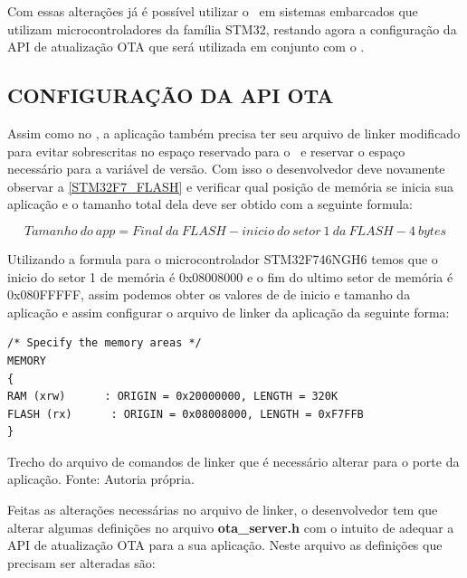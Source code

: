 Com essas alterações já é possível utilizar o \bootloader\ em sistemas embarcados que utilizam microcontroladores da família STM32, restando agora a configuração da API de atualização OTA que será utilizada em conjunto com o \bootloader.

\subsection{CONFIGURAÇÃO DA API OTA}
Assim como no \bootloader, a aplicação também precisa ter seu arquivo de linker modificado para evitar sobrescritas no espaço reservado para o \bootloader\ e reservar o espaço necessário para a variável de versão. Com isso o desenvolvedor deve novamente observar a \autoref{STM32F7_FLASH} e verificar qual posição de memória se inicia sua aplicação e o tamanho total dela deve ser obtido com a seguinte formula:

\begin{equation}
    Tamanho\ do\ app = Final\ da\ FLASH - inicio\ do\ setor\ 1\ da\ FLASH - 4\ bytes 
    \label{eq:calculo_flash}
\end{equation}


Utilizando a formula para o microcontrolador STM32F746NGH6 temos que o inicio do setor 1 de memória é 0x08008000 e o fim do ultimo setor de memória é 0x080FFFFF, assim podemos obter os valores de de inicio e tamanho da aplicação e assim configurar o arquivo de linker da aplicação da seguinte forma:


\begin{algorithm}[H]
\begin{lstlisting}
/* Specify the memory areas */
MEMORY
{
RAM (xrw)      : ORIGIN = 0x20000000, LENGTH = 320K
FLASH (rx)      : ORIGIN = 0x08008000, LENGTH = 0xF7FFB
}
\end{lstlisting}
\caption{Trecho do arquivo de comandos de linker que é necessário alterar para o porte da aplicação.
\newline Fonte: Autoria própria.}
\end{algorithm}

Feitas as alterações necessárias no arquivo de linker, o desenvolvedor tem que alterar algumas definições no arquivo \textbf{ota\_server.h} com o intuito de adequar a API de atualização OTA para a sua aplicação. Neste arquivo as definições que precisam ser alteradas são:

